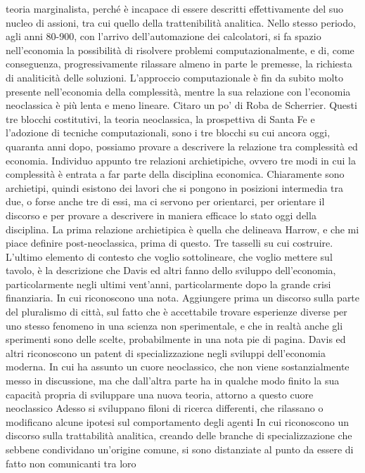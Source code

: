 \documentclass[a4paper, headings=standardclasses]{scrartcl}
\begin{document}
teoria marginalista, perché è incapace di essere descritti effettivamente del suo nucleo di assioni,
tra cui quello della trattenibilità analitica. Nello stesso periodo, agli anni 80-900, con l'arrivo
dell'automazione dei calcolatori, si fa spazio nell'economia la possibilità di risolvere problemi
computazionalmente, e di, come conseguenza, progressivamente rilassare almeno in parte
le premesse, la richiesta di analiticità delle soluzioni. L'approccio computazionale è fin da subito molto presente
nell'economia della complessità, mentre la sua relazione con l'economia neoclassica è più lenta e meno lineare.
Citaro un po' di Roba de Scherrier.
Questi tre blocchi costitutivi, la teoria neoclassica, la prospettiva di Santa Fe e l'adozione di tecniche
computazionali, sono i tre blocchi su cui ancora oggi, quaranta anni dopo, possiamo provare a descrivere
la relazione tra complessità ed economia.
Individuo appunto tre relazioni archietipiche, ovvero tre modi in cui la complessità è entrata a far parte
della disciplina economica. Chiaramente sono archietipi, quindi esistono dei lavori che si pongono in posizioni
intermedia tra due, o forse anche tre di essi, ma ci servono per orientarci, per orientare il discorso
e per provare a descrivere in maniera efficace lo stato oggi della disciplina.
La prima relazione archietipica è quella che delineava Harrow, e che mi piace definire post-neoclassica, prima di questo.
Tre tasselli su cui costruire.
L'ultimo elemento di contesto che voglio sottolineare, che voglio mettere sul tavolo, è la descrizione che Davis ed altri
fanno dello sviluppo dell'economia, particolarmente negli ultimi vent'anni, particolarmente dopo la grande crisi finanziaria.
In cui riconoscono una nota.
Aggiungere prima un discorso sulla parte del pluralismo di città, sul fatto che è accettabile trovare esperienze diverse
per uno stesso fenomeno in una scienza non sperimentale, e che in realtà anche gli sperimenti sono delle scelte,
probabilmente in una nota pie di pagina.
Davis ed altri riconoscono un patent di specializzazione negli sviluppi dell'economia moderna.
In cui ha assunto un cuore neoclassico, che non viene sostanzialmente messo in discussione, ma che dall'altra parte
ha in qualche modo finito la sua capacità propria di sviluppare una nuova teoria, attorno a questo cuore neoclassico
Adesso si sviluppano filoni di ricerca differenti, che rilassano o modificano alcune ipotesi sul comportamento degli agenti
In cui riconoscono un discorso sulla trattabilità analitica, creando delle branche di specializzazione
che sebbene condividano un'origine comune, si sono distanziate al punto da essere di fatto non comunicanti tra loro
\end{document}
